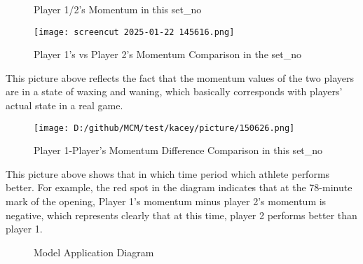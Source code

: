 \documentclass{mcmthesis}
\begin{document}
\begin{figure}[htbp]
    \centering
    \caption{Player 1/2's Momentum in this set\_no} 
    \label{Figure 4-5}
\end{figure}


\begin{figure}[htbp]
    \centering
    \texttt{[image: screencut 2025-01-22 145616.png]}
    \caption{Player 1's vs Player 2's Momentum Comparison in the set\_no} \label{Figure 6}
\end{figure}

This picture above reflects the fact that the momentum values of the two players are in a state
of waxing and waning, which basically corresponds with players' actual state in a real game.\cite{3}

\begin{figure}[htbp]
    \centering
    \texttt{[image: D:/github/MCM/test/kacey/picture/150626.png]}
    \caption{Player 1-Player's Momentum Difference Comparison in this set\_no} \label{Figure 7}
\end{figure}

This picture above shows that in which time period which athlete performs better. For
example, the red spot in the diagram indicates that at the 78-minute mark of the opening, Player
1's momentum minus player 2's momentum is negative, which represents clearly that at this time, player 2 performs better than player 1.

\begin{figure}[htbp]
    \centering
    \vspace{-0.15in}
    \begin{minipage}{1\linewidth}
    \end{minipage}
    \vskip -0.3cm
    \begin{minipage}{1\linewidth}
    \end{minipage}
    \vspace{-0.18in}
    \caption{Model Application Diagram} \label{Figure 8-11}
\end{figure}
\end{document}
